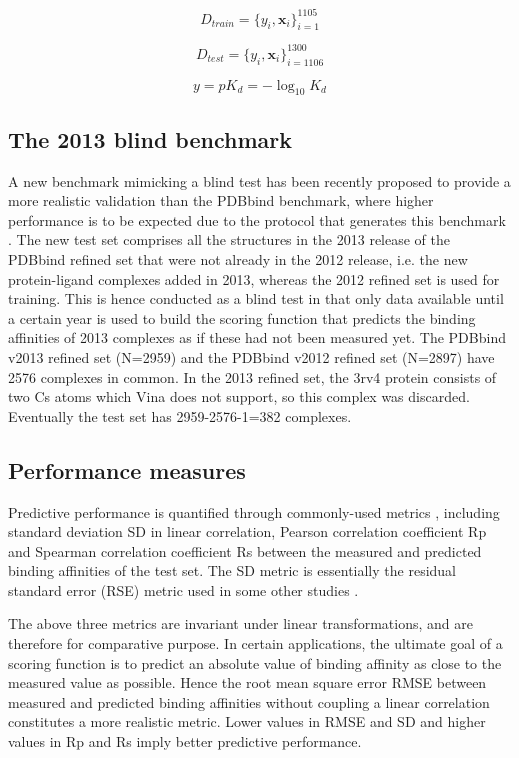 \documentclass{llncs}
\begin{document}
\begin{equation}
\label{rfscore3:D_train}
D_{train}=\{y_i,\mathbf x_i\}_{i=1}^{1105}
\end{equation}

\begin{equation}
\label{rfscore3:D_test}
D_{test}=\{y_i,\mathbf x_i\}_{i=1106}^{1300}
\end{equation}

\begin{equation}
\label{rfscore3:y}
y=pK_d=-\log_{10}K_d
\end{equation}

\subsection{The 2013 blind benchmark}

A new benchmark mimicking a blind test has been recently proposed to provide a more realistic validation than the PDBbind benchmark, where higher performance is to be expected due to the protocol that generates this benchmark \cite{908}. The new test set comprises all the structures in the 2013 release of the PDBbind refined set that were not already in the 2012 release, i.e. the new protein-ligand complexes added in 2013, whereas the 2012 refined set is used for training. This is hence conducted as a blind test in that only data available until a certain year is used to build the scoring function that predicts the binding affinities of 2013 complexes as if these had not been measured yet. The PDBbind v2013 refined set (N=2959) and the PDBbind v2012 refined set (N=2897) have 2576 complexes in common. In the 2013 refined set, the 3rv4 protein consists of two Cs atoms which Vina does not support, so this complex was discarded. Eventually the test set has 2959-2576-1=382 complexes.

\subsection{Performance measures}

Predictive performance is quantified through commonly-used metrics \cite{1313}, including standard deviation SD in linear correlation, Pearson correlation coefficient Rp and Spearman correlation coefficient Rs between the measured and predicted binding affinities of the test set. The SD metric is essentially the residual standard error (RSE) metric used in some other studies \cite{963}.

The above three metrics are invariant under linear transformations, and are therefore for comparative purpose. In certain applications, the ultimate goal of a scoring function is to predict an absolute value of binding affinity as close to the measured value as possible. Hence the root mean square error RMSE between measured and predicted binding affinities without coupling a linear correlation constitutes a more realistic metric. Lower values in RMSE and SD and higher values in Rp and Rs imply better predictive performance.
\end{document}
